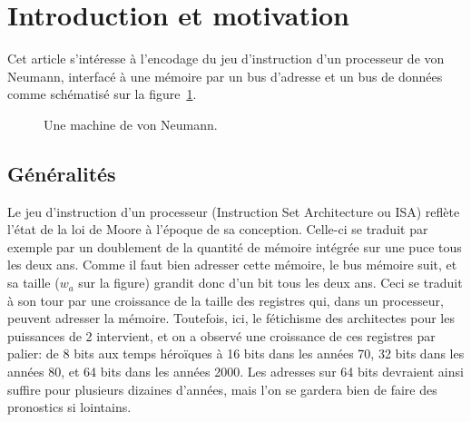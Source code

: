 \documentclass[architecture]{compas2018}
\begin{document}
\section{Introduction et motivation}
Cet article s'intéresse à l'encodage du jeu d'instruction d'un processeur de von Neumann, interfacé à une mémoire par un bus d'adresse et un bus de données comme schématisé sur la figure~\ref{fig:mvn}.

\newcommand{\figVonNeumann}{
}

\begin{figure}[ht]
  \begin{center}
    \figVonNeumann
  \end{center}
  \caption{Une machine de von Neumann.}
  \label{fig:mvn} 
\end{figure}

\subsection{Généralités}
Le jeu d'instruction d'un processeur (Instruction Set Architecture ou ISA) reflète l'état de la loi de Moore à l'époque de sa conception.
Celle-ci se traduit par exemple par un doublement de la quantité de mémoire intégrée sur une puce tous les deux ans.
Comme il faut bien adresser cette mémoire, le bus mémoire suit, et sa taille ($w_a$ sur la figure) grandit donc d'un bit tous les deux ans.
Ceci se traduit à son tour par une croissance de la taille des registres qui, dans un processeur, peuvent adresser la mémoire.
Toutefois, ici, le fétichisme des architectes pour les puissances de 2 intervient, et on a observé une croissance de ces registres par palier: de 8 bits aux temps héroïques à 16 bits dans les années 70, 32 bits dans les années 80, et 64 bits dans les années 2000.
Les adresses sur 64 bits devraient ainsi suffire pour plusieurs dizaines d'années, mais l'on se gardera bien de faire des pronostics si lointains.
\end{document}
